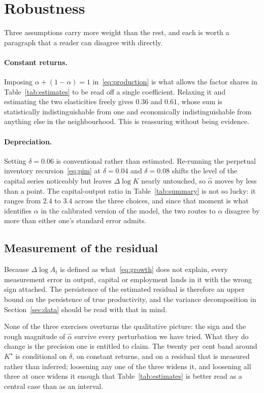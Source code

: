 \section{Robustness}
\label{sec:robustness}

Three assumptions carry more weight than the rest, and each is worth a paragraph
that a reader can disagree with directly.

\paragraph{Constant returns.} Imposing $\alpha + (1 - \alpha) = 1$
in~\eqref{eq:production} is what allows the factor shares in
Table~\ref{tab:estimates} to be read off a single coefficient. Relaxing it and
estimating the two elasticities freely gives $0.36$ and $0.61$, whose sum is
statistically indistinguishable from one and economically indistinguishable from
anything else in the neighbourhood. This is reassuring without being evidence.

\paragraph{Depreciation.} Setting $\delta = 0.06$ is conventional rather than
estimated. Re-running the perpetual inventory recursion~\eqref{eq:pim} at
$\delta = 0.04$ and $\delta = 0.08$ shifts the level of the capital series
noticeably but leaves $\Delta \log K$ nearly untouched, so $\hat{\alpha}$ moves
by less than a point. The capital-output ratio in Table~\ref{tab:summary} is not
so lucky: it ranges from $2.4$ to $3.4$ across the three choices, and since that
moment is what identifies $\alpha$ in the calibrated version of the model, the
two routes to $\alpha$ disagree by more than either one's standard error admits.

\subsection{Measurement of the residual}

Because $\Delta \log A_{t}$ is defined as what~\eqref{eq:growth} does not
explain, every measurement error in output, capital or employment lands in it
with the wrong sign attached. The persistence of the estimated residual is
therefore an upper bound on the persistence of true productivity, and the
variance decomposition in Section~\ref{sec:data} should be read with that in
mind.

None of the three exercises overturns the qualitative picture: the sign and the
rough magnitude of $\hat{\alpha}$ survive every perturbation we have tried. What
they do change is the precision one is entitled to claim. The twenty per cent
band around $K^{\star}$ is conditional on $\delta$, on constant returns, and on
a residual that is measured rather than inferred; loosening any one of the three
widens it, and loosening all three at once widens it enough that
Table~\ref{tab:estimates} is better read as a central case than as an interval.
